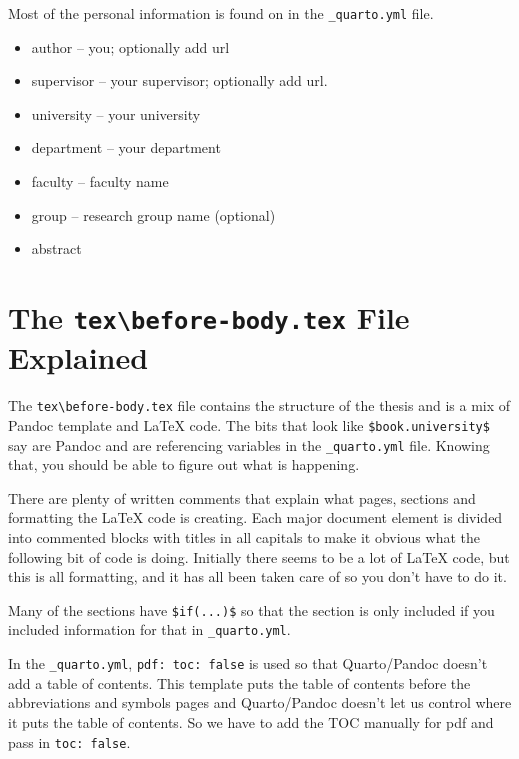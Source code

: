 \documentclass[
  letterpaper,
  11pt,
  english,
  singlespacing,
  headsepline]{MastersDoctoralThesis}
\providecommand{\tightlist}{%
  \setlength{\itemsep}{0pt}\setlength{\parskip}{0pt}}\usepackage{longtable,booktabs,array}
\begin{document}
Most of the personal information is found on in the
\texttt{\_quarto.yml} file.

\begin{itemize}
\tightlist
\item
  author -- you; optionally add url
\item
  supervisor -- your supervisor; optionally add url.
\item
  university -- your university
\item
  department -- your department
\item
  faculty -- faculty name
\item
  group -- research group name (optional)
\item
  abstract
\end{itemize}

\section{\texorpdfstring{The \texttt{tex\textbackslash{}before-body.tex}
File
Explained}{The tex\textbackslash before-body.tex File Explained}}\label{the-texbefore-body.tex-file-explained-1}

The \texttt{tex\textbackslash{}before-body.tex} file contains the
structure of the thesis and is a mix of Pandoc template and \LaTeX{}
code. The bits that look like \texttt{\$book.university\$} say are
Pandoc and are referencing variables in the \texttt{\_quarto.yml} file.
Knowing that, you should be able to figure out what is happening.

There are plenty of written comments that explain what pages, sections
and formatting the \LaTeX{} code is creating. Each major document
element is divided into commented blocks with titles in all capitals to
make it obvious what the following bit of code is doing. Initially there
seems to be a lot of \LaTeX{} code, but this is all formatting, and it
has all been taken care of so you don't have to do it.

Many of the sections have \texttt{\$if(...)\$} so that the section is
only included if you included information for that in
\texttt{\_quarto.yml}.

In the \texttt{\_quarto.yml}, \texttt{pdf:\ toc:\ false} is used so that
Quarto/Pandoc doesn't add a table of contents. This template puts the
table of contents before the abbreviations and symbols pages and
Quarto/Pandoc doesn't let us control where it puts the table of
contents. So we have to add the TOC manually for pdf and pass in
\texttt{toc:\ false}.
\end{document}
